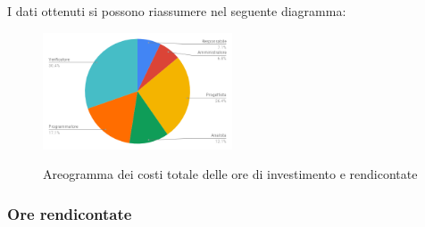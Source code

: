 I dati ottenuti si possono riassumere nel seguente diagramma:
\begin{figure}[H] 
			\centering 
				\includegraphics[width=0.5\textwidth]{res/images/areogramma_riepilogo.png}\\
				\caption{Areogramma dei costi totale delle ore di investimento e rendicontate}
			\label{AreogrammaRiepilogoRuoli}
\end{figure}


\subsubsection{Ore rendicontate}
